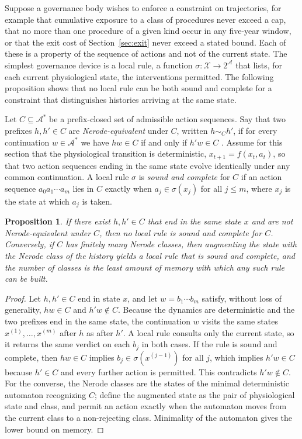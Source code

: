 \documentclass[11pt]{article}
\theoremstyle{plain}
\newtheorem{proposition}{Proposition}
\theoremstyle{definition}
\theoremstyle{remark}
\begin{document}
Suppose a governance body wishes to enforce a constraint on trajectories, for example that cumulative exposure to a class of procedures never exceed a cap, that no more than one procedure of a given kind occur in any five-year window, or that the exit cost of Section~\ref{sec:exit} never exceed a stated bound. Each of these is a property of the sequence of actions and not of the current state. The simplest governance device is a local rule, a function $\sigma:\mathcal X\to 2^{\mathcal A}$ that lists, for each current physiological state, the interventions permitted. The following proposition shows that no local rule can be both sound and complete for a constraint that distinguishes histories arriving at the same state.

Let $C\subseteq\mathcal A^*$ be a prefix-closed set of admissible action sequences. Say that two prefixes $h,h'\in C$ are \emph{Nerode-equivalent} under $C$, written $h\sim_C h'$, if for every continuation $w\in\mathcal A^*$ we have $hw\in C$ if and only if $h'w\in C$ \cite{nerode1958}. Assume for this section that the physiological transition is deterministic, $x_{t+1}=f(x_t,a_t)$, so that two action sequences ending in the same state evolve identically under any common continuation. A local rule $\sigma$ is \emph{sound and complete} for $C$ if an action sequence $a_0a_1\cdots a_m$ lies in $C$ exactly when $a_j\in\sigma(x_j)$ for all $j\le m$, where $x_j$ is the state at which $a_j$ is taken.

\begin{proposition}\label{prop:local}
If there exist $h,h'\in C$ that end in the same state $x$ and are not Nerode-equivalent under $C$, then no local rule is sound and complete for $C$. Conversely, if $C$ has finitely many Nerode classes, then augmenting the state with the Nerode class of the history yields a local rule that is sound and complete, and the number of classes is the least amount of memory with which any such rule can be built.
\end{proposition}

\begin{proof}
Let $h,h'\in C$ end in state $x$, and let $w=b_1\cdots b_m$ satisfy, without loss of generality, $hw\in C$ and $h'w\notin C$. Because the dynamics are deterministic and the two prefixes end in the same state, the continuation $w$ visits the same states $x^{(1)},\dots,x^{(m)}$ after $h$ as after $h'$. A local rule consults only the current state, so it returns the same verdict on each $b_j$ in both cases. If the rule is sound and complete, then $hw\in C$ implies $b_j\in\sigma(x^{(j-1)})$ for all $j$, which implies $h'w\in C$ because $h'\in C$ and every further action is permitted. This contradicts $h'w\notin C$. For the converse, the Nerode classes are the states of the minimal deterministic automaton recognizing $C$; define the augmented state as the pair of physiological state and class, and permit an action exactly when the automaton moves from the current class to a non-rejecting class. Minimality of the automaton gives the lower bound on memory.
\end{proof}
\end{document}
